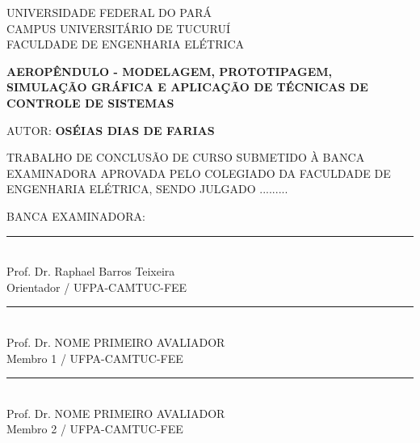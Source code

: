 
	\thispagestyle{empty}
	
	\begin{center}
			UNIVERSIDADE FEDERAL DO PARÁ\\
			CAMPUS UNIVERSITÁRIO DE TUCURUÍ\\
			FACULDADE DE ENGENHARIA ELÉTRICA
			
			\vspace{0.1cm}
			

			\textbf{AEROPÊNDULO - MODELAGEM, PROTOTIPAGEM, SIMULAÇÃO GRÁFICA E APLICAÇÃO DE TÉCNICAS DE CONTROLE DE SISTEMAS}
			
			\vspace{-0.1cm}
			
			\begin{flushleft}
				AUTOR:\textbf{ OSÉIAS DIAS DE FARIAS}
			\end{flushleft}
			\vspace{-0.1cm}
	\end{center}

			\par\noindent \small{TRABALHO DE CONCLUSÃO DE CURSO SUBMETIDO  À BANCA EXAMINADORA APROVADA PELO COLEGIADO DA FACULDADE DE ENGENHARIA ELÉTRICA, SENDO JULGADO .........}
			


			\begin{center}
			\begin{flushleft}
			BANCA EXAMINADORA:	
			\end{flushleft}
		
			\vspace{0.45cm}
		
			\par\noindent\rule{0.7\textwidth}{0.2pt}\\ \vspace{-0.2cm}
			Prof. Dr. Raphael Barros Teixeira\\ \vspace{-0.2cm}
			{\small Orientador / UFPA-CAMTUC-FEE}
			\vspace{0.3cm}
			
			\par\noindent\rule{0.7\textwidth}{0.2pt}\\ \vspace{-0.2cm}
			Prof. Dr. NOME PRIMEIRO AVALIADOR\\ \vspace{-0.2cm}
			{\small Membro 1 / UFPA-CAMTUC-FEE}
			\vspace{0.3cm}

   		\par\noindent\rule{0.7\textwidth}{0.2pt}\\ \vspace{-0.2cm}
			Prof. Dr. NOME PRIMEIRO AVALIADOR\\ \vspace{-0.2cm}
			{\small Membro 2 / UFPA-CAMTUC-FEE}
			\vspace{0.3cm}

			
	\end{center}
